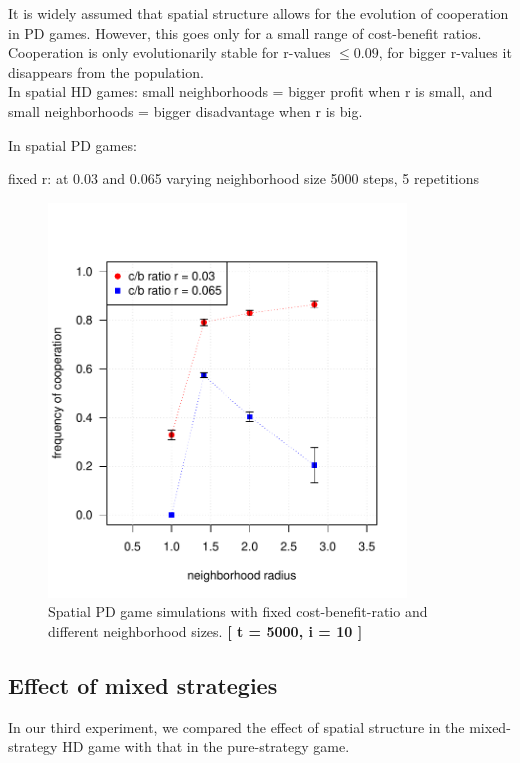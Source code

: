 It is widely assumed that spatial structure allows for the evolution of cooperation in PD games. However, this goes only for a small range of cost-benefit ratios. Cooperation is only evolutionarily stable for r-values $ \leq 0.09$, for bigger r-values it disappears from the population.\\
 
In spatial HD games: small neighborhoods = bigger profit when r is small, and small neighborhoods = bigger disadvantage when r is big.

In spatial PD games: 


fixed r: at 0.03 and 0.065
varying neighborhood size
5000 steps, 5 repetitions

\begin{figure}[H]
	\centering 
	\includegraphics[width=9.5cm]{task2_radiusplot}
	\caption{Spatial PD game simulations with fixed cost-benefit-ratio and different neighborhood sizes.  \textbf{[ t = 5000, i = 10 ]} }\label{fig: task2_radiusplot}
\end{figure}


\subsection{Effect of mixed strategies}

In our third experiment, we compared the effect of spatial structure in the mixed-strategy HD game with that in the pure-strategy game.



